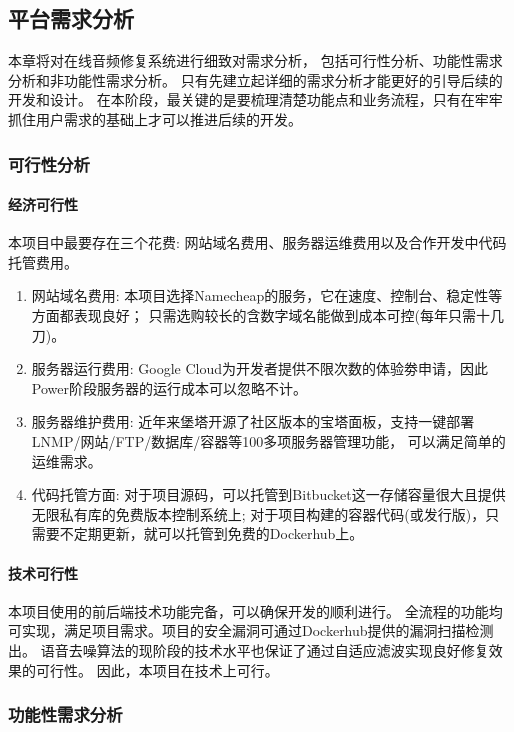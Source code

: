 \documentclass{morningstar}
\begin{document}
\subsection{平台需求分析}
本章将对在线音频修复系统进行细致对需求分析，
包括可行性分析、功能性需求分析和非功能性需求分析。
只有先建立起详细的需求分析才能更好的引导后续的开发和设计。
在本阶段，最关键的是要梳理清楚功能点和业务流程，只有在牢牢抓住用户需求的基础上才可以推进后续的开发。


\subsubsection{可行性分析}

\paragraph{经济可行性}
本项目中最要存在三个花费: 网站域名费用、服务器运维费用以及合作开发中代码托管费用。
\begin{enumerate}
\item 网站域名费用: 本项目选择Namecheap的服务，它在速度、控制台、稳定性等方面都表现良好；
只需选购较长的含数字域名能做到成本可控(每年只需十几刀)。
\item 服务器运行费用: Google Cloud为开发者提供不限次数的体验劵申请，因此Power阶段服务器的运行成本可以忽略不计。
\item 服务器维护费用: 近年来堡塔开源了社区版本的宝塔面板，支持一键部署LNMP/网站/FTP/数据库/容器等100多项服务器管理功能，
可以满足简单的运维需求。\cite{baota1}
\item 代码托管方面: 对于项目源码，可以托管到Bitbucket这一存储容量很大且提供无限私有库的免费版本控制系统上;
对于项目构建的容器代码(或发行版)，只需要不定期更新，就可以托管到免费的Dockerhub上。
\end{enumerate}


\paragraph{技术可行性}
本项目使用的前后端技术功能完备，可以确保开发的顺利进行。
全流程的功能均可实现，满足项目需求。项目的安全漏洞可通过Dockerhub提供的漏洞扫描检测出。
语音去噪算法的现阶段的技术水平也保证了通过自适应滤波实现良好修复效果的可行性。
因此，本项目在技术上可行。


\subsubsection{功能性需求分析}
\end{document}
